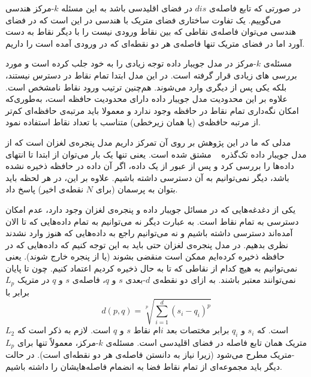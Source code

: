 در صورتی که تابع فاصله‌ی $dis$ در فضای اقلیدسی باشد به این مسئله $k$-مرکز هندسی می‌گوییم. یک تفاوت ساختاری فضای متریک با هندسی در این است که در فضای هندسی می‌توان فاصله‌ی نقاطی که بین نقاط ورودی نیست را با دیگر نقاط به دست آورد اما در فضای متریک تنها فاصله‌ی هر دو نقطه‌ای که در ورودی آمده است را داریم.

مسئله‌ی $k$-مرکز در مدل جویبار داده توجه زیادی را به خود جلب کرده است و مورد بررسی ‌های زیادی قرار گرفته است. در این مدل ابتدا تمام نقاط در دسترس نیستند، بلکه یکی پس از دیگری وارد می‌شوند. هم‌چنین ترتیب ورود نقاط نامشخص است. 
علاوه بر این محدودیت مدل جویبار داده دارای محدودیت حافظه است، به‌طوری‌که امکان نگه‌داری تمام نقاط در حافظه  وجود ندارد و معمولا باید مرتبه‌ی حافظه‌ای کم‌تر از مرتبه حافظه‌ی  (یا همان زیرخطی) متناسب با تعداد نقاط استفاده نمود.

مدلی که ما در این پژوهش بر روی آن تمرکز داریم مدل پنجره‌ی لغزان است که از مدل جویبار داده تک‌گذره ~ مشتق شده‌ است.
یعنی تنها یک بار می‌توان از ابتدا تا انتهای داده‌ها را بررسی کرد و پس از عبور از یک داده، اگر آن داده در حافظه ذخیره نشده باشد، دیگر نمی‌توانیم به آن دسترسی داشته باشیم. علاوه بر این، در هر لحظه باید بتوان به پرسمان (برای $N$ نقطه‌ی اخیر) پاسخ داد.

یکی از دغدغه‌هایی که در مسائل جویبار داده  و پنجره‌ی لغزان وجود دارد، عدم امکان دسترسی به تمام نقاط است.
به عبارت دیگر نه می‌توانیم به تمام داده‌هایی که تا الان آمده‌اند دسترسی داشته باشیم و نه می‌توانیم راجع به داده‌هایی که هنوز وارد نشدند نظری بدهیم. در مدل پنجره‌ی لغزان حتی باید به این توجه کنیم که داده‌هایی که در حافظه ذخیره کرده‌ایم ممکن است منقضی بشوند (یا از پنجره‌ خارج شوند). یعنی نمی‌توانیم به هیچ کدام از نقاطی که تا به حال ذخیره کردیم اعتماد کنیم. چون تا پایان نمی‌توانند معتبر باشند.
به ازای دو نقطه‌ی $d$-بعدی $s$ و $q$، فاصله‌ی $s$ و $q$ در متریک $L_p$ برابر با
$$d(p, q) = \sqrt[p]{\sum_{i=1}^{d} (s_i - q_i) ^ p}$$
است. که $s_i$ و $q_i$ برابر مختصات بعد $i$ام نقاط $s$ و $q$ است. 
لازم به ذکر است که $L_2$ متریک همان تابع فاصله در فضای اقلیدسی است. مسئله‌ی $k$-مرکز، معمولاً تنها برای $L_p$-متریک مطرح می‌شود (زیرا نیاز به دانستن فاصله‌ی هر دو نقطه‌ای است). در حالت دیگر باید مجموعه‌ای از تمام نقاط فضا به انضمام فاصله‌هایشان را داشته باشیم.
%
%

